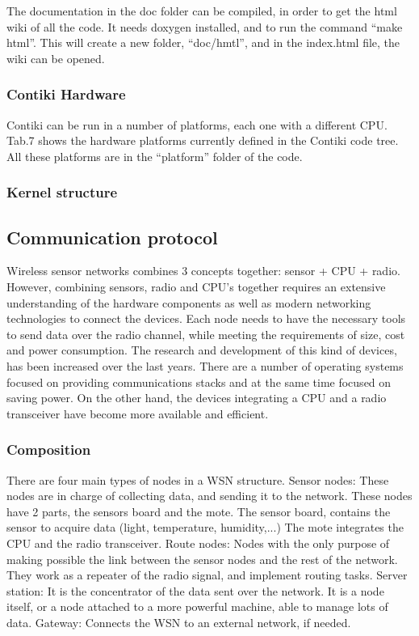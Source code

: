 The documentation in the doc folder can be compiled,
	in order to get the html wiki of all the code.
It needs doxygen installed,
	and to run the command “make html”.
This will create a new folder,
	“doc/hmtl”,
	and in the index.html file,
	the wiki can be opened.


\subsubsection{Contiki Hardware}
Contiki can be run in a number of platforms,
	each one with a different CPU.
Tab.7 shows the hardware platforms currently defined in the Contiki code tree.
All these platforms are in the “platform” folder of the code.

\subsubsection{Kernel structure}


\subsection{Communication protocol}

Wireless sensor networks combines 3 concepts together:
	sensor + CPU + radio.
However,
	combining sensors,
	radio and CPU's together requires an extensive understanding of the hardware components as well as modern networking technologies to connect the devices.
Each node needs to have the necessary tools to send data over the radio channel,
	while meeting the requirements of size,
	cost and power consumption.
The research and development of this kind of devices,
	has been increased over the last years.
There are a number of operating systems focused on providing communications stacks and at the same time focused on saving power.
On the other hand,
	the devices integrating a CPU and a radio transceiver have become more available and efficient.

\subsubsection{Composition}
There are four main types of nodes in a WSN structure.
Sensor nodes:
	These nodes are in charge of collecting data,
	and sending it to the network.
These nodes have 2 parts,
	the sensors board and the mote.
The sensor board,
	contains the sensor to acquire data (light,
	temperature,
	humidity,...) The mote integrates the CPU and the radio transceiver.
Route nodes:
	Nodes with the only purpose of making possible the link between the sensor nodes and the rest of the network.
They work as a repeater of the radio signal,
	and implement routing tasks.
Server station:
	It is the concentrator of the data sent over the network.
It is a node itself,
	or a node attached to a more powerful machine,
	able to manage lots of data.
Gateway:
	Connects the WSN to an external network,
	if needed.

